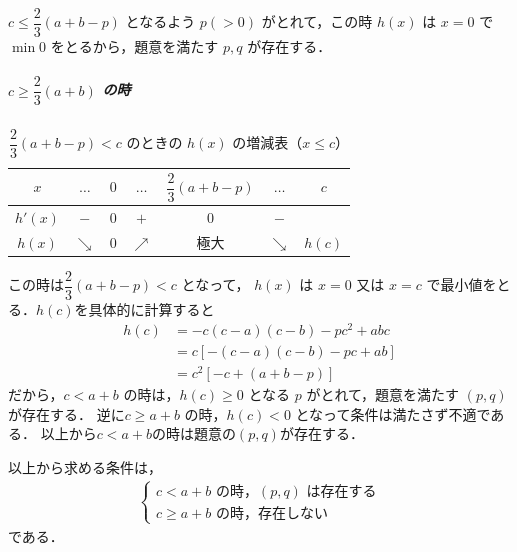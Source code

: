 \documentclass[../../main.tex]{subfiles}
\begin{document}
$c \le \dfrac{2}{3}(a+b-p)$ となるよう $p (>0)$ がとれて，この時 $h(x)$ は $x=0$ で $\min 0$ をとるから，題意を満たす $p, q$ が存在する．

\subparagraph{$c \ge \dfrac{2}{3}(a+b)$ の時}

\begin{table}[htb]
  \centering
  \caption{$\dfrac{2}{3}(a+b-p) < c$ のときの $h(x)$ の増減表（$x \le c$）}
  \label{tab:1962_4_case2}
  \renewcommand{\arraystretch}{1.4}
  \begin{tabular}{c|cccccc}
    \hline
    $x$ & $\dots$ & $0$ & $\dots$ & $\dfrac{2}{3}(a+b-p)$ & $\dots$ & $c$ \\ \hline
    $h'(x)$ & $-$ & $0$ & $+$ & $0$ & $-$ & \\ \hline
    $h(x)$ & $\searrow$ & $0$ & $\nearrow$ & 極大 & $\searrow$ & $h(c)$ \\ \hline
  \end{tabular}
\end{table}

この時は$\dfrac{2}{3}(a+b-p) < c$ となって，
$h(x)$ は $x=0$ 又は $x=c$ で最小値をとる．$h(c)$を具体的に計算すると
\begin{align}
  h(c)
  &= -c(c-a)(c-b) - pc^2 + abc \\
  &= c [ -(c-a)(c-b) - pc + ab ] \\
  &= c^2 [ -c + (a+b-p) ]
\end{align}
だから，$c < a+b$ の時は，$h(c) \ge 0$ となる $p$ がとれて，題意を満たす $(p, q)$ が存在する．
逆に$c \ge a+b$ の時，$h(c) < 0$ となって条件は満たさず不適である．
以上から$c < a+b$の時は題意の$(p,q)$が存在する．
\casesend

以上から求める条件は，
\begin{align}
  \begin{cases}
    c < a+b \text{ の時，} (p, q) \text{ は存在する} \\
    c \ge a+b \text{ の時，存在しない}
  \end{cases}
\end{align}
である．

\newpage
\end{document}
